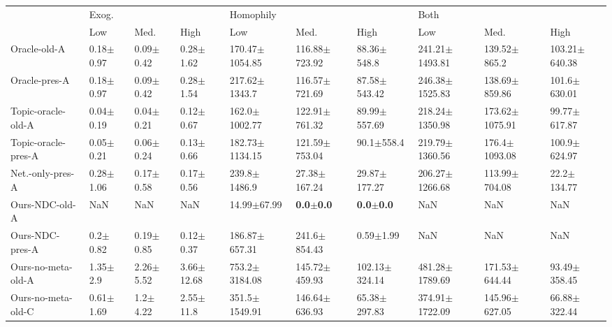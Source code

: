 \begin{tabular}{llllllllll}
\toprule
{} & \multicolumn{3}{l}{Exog.} & \multicolumn{3}{l}{Homophily} & \multicolumn{3}{l}{Both} \\
{} &            Low &           Med. &            High &                         Low &                  Med. &                  High &                 Low &                Med. &               High \\
\midrule
Oracle-old-A        &  0.18$\pm$0.97 &  0.09$\pm$0.42 &   0.28$\pm$1.62 &          170.47$\pm$1054.85 &     116.88$\pm$723.92 &       88.36$\pm$548.8 &  241.21$\pm$1493.81 &    139.52$\pm$865.2 &  103.21$\pm$640.38 \\
Oracle-pres-A       &  0.18$\pm$0.97 &  0.09$\pm$0.42 &   0.28$\pm$1.54 &           217.62$\pm$1343.7 &     116.57$\pm$721.69 &      87.58$\pm$543.42 &  246.38$\pm$1525.83 &   138.69$\pm$859.86 &   101.6$\pm$630.01 \\
Topic-oracle-old-A  &  0.04$\pm$0.19 &  0.04$\pm$0.21 &   0.12$\pm$0.67 &           162.0$\pm$1002.77 &     122.91$\pm$761.32 &      89.99$\pm$557.69 &  218.24$\pm$1350.98 &  173.62$\pm$1075.91 &   99.77$\pm$617.87 \\
Topic-oracle-pres-A &  0.05$\pm$0.21 &  0.06$\pm$0.24 &   0.13$\pm$0.66 &          182.73$\pm$1134.15 &     121.59$\pm$753.04 &        90.1$\pm$558.4 &  219.79$\pm$1360.56 &   176.4$\pm$1093.08 &   100.9$\pm$624.97 \\
Net.-only-pres-A    &  0.28$\pm$1.06 &  0.17$\pm$0.58 &   0.17$\pm$0.56 &            239.8$\pm$1486.9 &      27.38$\pm$167.24 &      29.87$\pm$177.27 &  206.27$\pm$1266.68 &   113.99$\pm$704.08 &    22.2$\pm$134.77 \\
Ours-NDC-old-A      &            NaN &            NaN &             NaN &             14.99$\pm$67.99 &  \textbf{0.0$\pm$0.0} &  \textbf{0.0$\pm$0.0} &                 NaN &                 NaN &                NaN \\
Ours-NDC-pres-A     &   0.2$\pm$0.82 &  0.19$\pm$0.85 &   0.12$\pm$0.37 &           186.87$\pm$657.31 &      241.6$\pm$854.43 &         0.59$\pm$1.99 &                 NaN &                 NaN &                NaN \\
Ours-no-meta-old-A  &   1.35$\pm$2.9 &  2.26$\pm$5.52 &  3.66$\pm$12.68 &           753.2$\pm$3184.08 &     145.72$\pm$459.93 &     102.13$\pm$324.14 &  481.28$\pm$1789.69 &   171.53$\pm$644.44 &   93.49$\pm$358.45 \\
Ours-no-meta-old-C  &  0.61$\pm$1.69 &   1.2$\pm$4.22 &   2.55$\pm$11.8 &           351.5$\pm$1549.91 &     146.64$\pm$636.93 &      65.38$\pm$297.83 &  374.91$\pm$1722.09 &   145.96$\pm$627.05 &   66.88$\pm$322.44 \\

\end{tabular}
